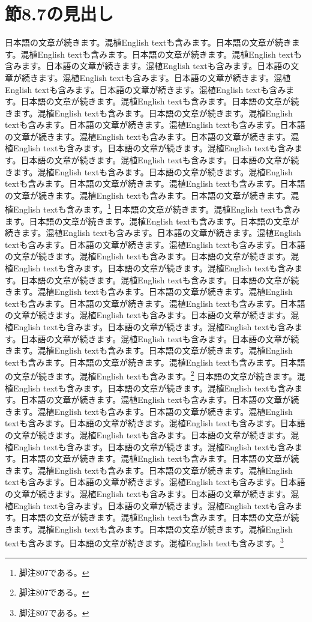 \documentclass[pdflatex,book]{jlreq}
\begin{document}
\section{節8.7の見出し}
日本語の文章が続きます。混植English textも含みます。日本語の文章が続きます。混植English textも含みます。日本語の文章が続きます。混植English textも含みます。日本語の文章が続きます。混植English textも含みます。日本語の文章が続きます。混植English textも含みます。日本語の文章が続きます。混植English textも含みます。日本語の文章が続きます。混植English textも含みます。日本語の文章が続きます。混植English textも含みます。日本語の文章が続きます。混植English textも含みます。日本語の文章が続きます。混植English textも含みます。日本語の文章が続きます。混植English textも含みます。日本語の文章が続きます。混植English textも含みます。日本語の文章が続きます。混植English textも含みます。日本語の文章が続きます。混植English textも含みます。日本語の文章が続きます。混植English textも含みます。日本語の文章が続きます。混植English textも含みます。日本語の文章が続きます。混植English textも含みます。日本語の文章が続きます。混植English textも含みます。日本語の文章が続きます。混植English textも含みます。日本語の文章が続きます。混植English textも含みます。\footnote{脚注807である。}
日本語の文章が続きます。混植English textも含みます。日本語の文章が続きます。混植English textも含みます。日本語の文章が続きます。混植English textも含みます。日本語の文章が続きます。混植English textも含みます。日本語の文章が続きます。混植English textも含みます。日本語の文章が続きます。混植English textも含みます。日本語の文章が続きます。混植English textも含みます。日本語の文章が続きます。混植English textも含みます。日本語の文章が続きます。混植English textも含みます。日本語の文章が続きます。混植English textも含みます。日本語の文章が続きます。混植English textも含みます。日本語の文章が続きます。混植English textも含みます。日本語の文章が続きます。混植English textも含みます。日本語の文章が続きます。混植English textも含みます。日本語の文章が続きます。混植English textも含みます。日本語の文章が続きます。混植English textも含みます。日本語の文章が続きます。混植English textも含みます。日本語の文章が続きます。混植English textも含みます。日本語の文章が続きます。混植English textも含みます。日本語の文章が続きます。混植English textも含みます。\footnote{脚注807である。}
日本語の文章が続きます。混植English textも含みます。日本語の文章が続きます。混植English textも含みます。日本語の文章が続きます。混植English textも含みます。日本語の文章が続きます。混植English textも含みます。日本語の文章が続きます。混植English textも含みます。日本語の文章が続きます。混植English textも含みます。日本語の文章が続きます。混植English textも含みます。日本語の文章が続きます。混植English textも含みます。日本語の文章が続きます。混植English textも含みます。日本語の文章が続きます。混植English textも含みます。日本語の文章が続きます。混植English textも含みます。日本語の文章が続きます。混植English textも含みます。日本語の文章が続きます。混植English textも含みます。日本語の文章が続きます。混植English textも含みます。日本語の文章が続きます。混植English textも含みます。日本語の文章が続きます。混植English textも含みます。日本語の文章が続きます。混植English textも含みます。日本語の文章が続きます。混植English textも含みます。日本語の文章が続きます。混植English textも含みます。日本語の文章が続きます。混植English textも含みます。\footnote{脚注807である。}
\end{document}
